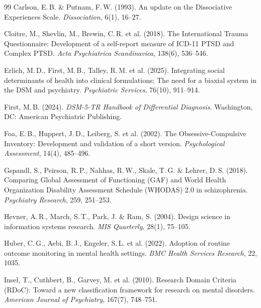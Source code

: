 \documentclass[11pt,a4paper]{article}
\begin{document}
\begin{thebibliography}{99}
Carlson, E.\,B. \& Putnam, F.\,W. (1993).
\newblock An update on the Dissociative Experiences Scale.
\newblock \textit{Dissociation}, 6(1), 16--27.

Cloitre, M., Shevlin, M., Brewin, C.\,R. et al. (2018).
\newblock The International Trauma Questionnaire: Development of a self-report measure of ICD-11 PTSD and Complex PTSD.
\newblock \textit{Acta Psychiatrica Scandinavica}, 138(6), 536--546.

Erlich, M.\,D., First, M.\,B., Talley, R.\,M. et al. (2025).
\newblock Integrating social determinants of health into clinical formulations: The need for a biaxial system in the DSM and psychiatry.
\newblock \textit{Psychiatric Services}, 76(10), 911--914.

First, M.\,B. (2024).
\newblock \textit{DSM-5-TR Handbook of Differential Diagnosis}.
\newblock Washington, DC: American Psychiatric Publishing.

Foa, E.\,B., Huppert, J.\,D., Leiberg, S. et al. (2002).
\newblock The Obsessive-Compulsive Inventory: Development and validation of a short version.
\newblock \textit{Psychological Assessment}, 14(4), 485--496.

Gspandl, S., Peirson, R.\,P., Nahhas, R.\,W., Skale, T.\,G. \& Lehrer, D.\,S. (2018).
\newblock Comparing Global Assessment of Functioning (GAF) and World Health Organization Disability Assessment Schedule (WHODAS) 2.0 in schizophrenia.
\newblock \textit{Psychiatry Research}, 259, 251--253.

Hevner, A.\,R., March, S.\,T., Park, J. \& Ram, S. (2004).
\newblock Design science in information systems research.
\newblock \textit{MIS Quarterly}, 28(1), 75--105.

Huber, C.\,G., Aebi, B.\,J., Engeler, S.\,L. et al. (2022).
\newblock Adoption of routine outcome monitoring in mental health settings.
\newblock \textit{BMC Health Services Research}, 22, 1035.

Insel, T., Cuthbert, B., Garvey, M. et al. (2010).
\newblock Research Domain Criteria (RDoC): Toward a new classification framework for research on mental disorders.
\newblock \textit{American Journal of Psychiatry}, 167(7), 748--751.


\end{thebibliography}
\end{document}
